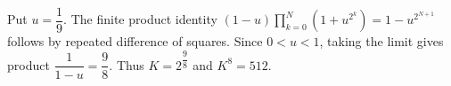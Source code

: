 Put $u=\dfrac{1}{9}$. The finite product identity $(1-u)\prod_{k=0}^{N}(1+u^{2^k})=1-u^{2^{N+1}}$ follows by repeated difference of squares. Since $0<u<1$, taking the limit gives product $\dfrac{1}{1-u}=\dfrac{9}{8}$. Thus $K=2^{\dfrac{9}{8}}$ and $\boxed{K^8=512}$.
